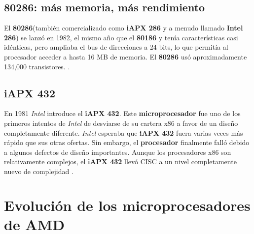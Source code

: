 \subsection{\textbf{80286}: más memoria, más rendimiento}
El \textbf{80286}(también comercializado como \textbf{iAPX 286} y a menudo llamado \textbf{Intel 286}) se lanzó en 1982, el mismo año que el \textbf{80186} y tenía
características casi idénticas, pero ampliaba el bus de direcciones a 24 bits, lo que permitía al procesador acceder a hasta 16 MB de memoria.
El \textbf{80286} usó aproximadamente 134,000 transistores. .

\subsection{iAPX 432}
En 1981 \emph{Intel} introduce el \textbf{iAPX 432}. Este \textbf{microprocesador} fue uno de los primeros intentos de \emph{Intel} de desviarse de su cartera x86
a favor de un diseño completamente diferente. \emph{Intel} esperaba que \textbf{iAPX 432} fuera varias veces más rápido que sus otras ofertas. Sin embargo, el \textbf
{procesador} finalmente falló debido a algunos defectos de diseño importantes. Aunque los procesadores x86 son relativamente complejos, el \textbf{iAPX 432} 
llevó CISC a un nivel completamente nuevo de complejidad .

\section{Evolución de los microprocesadores de AMD}



